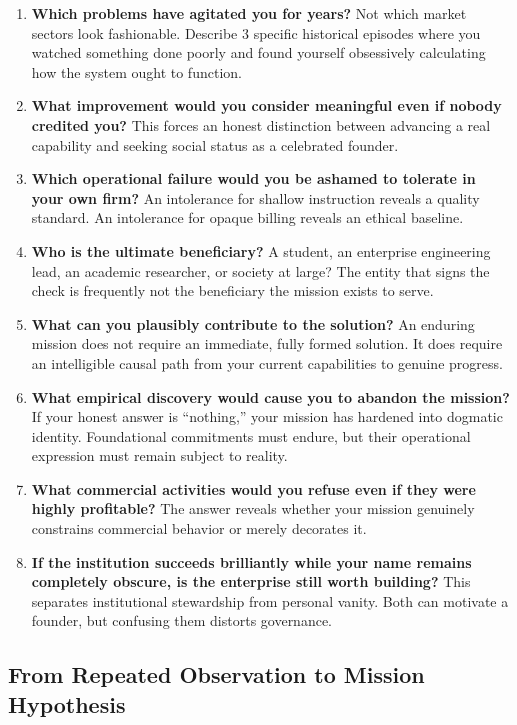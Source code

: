 \begin{enumerate}[leftmargin=12pt,itemsep=3pt,topsep=1pt,parsep=0pt]
  \item \textbf{Which problems have agitated you for years?} Not which market sectors look fashionable. Describe 3 specific historical episodes where you watched something done poorly and found yourself obsessively calculating how the system ought to function.
  \item \textbf{What improvement would you consider meaningful even if nobody credited you?} This forces an honest distinction between advancing a real capability and seeking social status as a celebrated founder.
  \item \textbf{Which operational failure would you be ashamed to tolerate in your own firm?} An intolerance for shallow instruction reveals a quality standard. An intolerance for opaque billing reveals an ethical baseline.
  \item \textbf{Who is the ultimate beneficiary?} A student, an enterprise engineering lead, an academic researcher, or society at large? The entity that signs the check is frequently not the beneficiary the mission exists to serve.
  \item \textbf{What can you plausibly contribute to the solution?} An enduring mission does not require an immediate, fully formed solution. It does require an intelligible causal path from your current capabilities to genuine progress.
  \item \textbf{What empirical discovery would cause you to abandon the mission?} If your honest answer is ``nothing,'' your mission has hardened into dogmatic identity. Foundational commitments must endure, but their operational expression must remain subject to reality.
  \item \textbf{What commercial activities would you refuse even if they were highly profitable?} The answer reveals whether your mission genuinely constrains commercial behavior or merely decorates it.
  \item \textbf{If the institution succeeds brilliantly while your name remains completely obscure, is the enterprise still worth building?} This separates institutional stewardship from personal vanity. Both can motivate a founder, but confusing them distorts governance.
\end{enumerate}

\subsection{From Repeated Observation to Mission Hypothesis}

